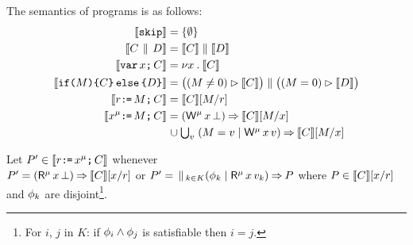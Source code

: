 The semantics of programs is as follows: %
\allowdisplaybreaks
\begin{align*}
  \sem{\SKIP} & =
  \{ \emptyset \}
  \\
  \sem{\aCmd \PAR \bCmd} & =
  \sem{\aCmd} \parallel \sem{\bCmd} 
  \\
  \sem{\VAR\aLoc\SEMI \aCmd} & =
  \nu \aLoc \st \sem{\aCmd}
  \\  
  \sem{\IF{\aExp} \THEN \aCmd \ELSE \bCmd \FI} & =
  \bigl((\aExp \neq 0) \guard \sem{\aCmd}\bigr) \parallel \bigl((\aExp=0) \guard \sem{\bCmd}\bigr) 
  \\
  \sem{\aReg\GETS\aExp\SEMI \aCmd} & =
  \sem{\aCmd}[\aExp/\aReg] 
  \\
  \sem{\aLoc^\amode\GETS\aExp\SEMI \aCmd} & =
  (\iDWmode{\aLoc}{}) \prefix \sem{\aCmd}[\aExp/\aLoc]
  \\ & \mkern2mu\cup
  \textstyle\bigcup_\aVal\; (\aExp=\aVal \mid \DWmode\aLoc\aVal) \prefix \sem{\aCmd}[\aExp/\aLoc]
\end{align*}

\begin{definition}
  Let $P'\in\llbracket r\texttt{:}\mkern-1mu\texttt{=}\,x^\mu\texttt{;}\,\allowbreak C\rrbracket$ whenever\\
  $\aPS'=(\iDRmode{\aLoc}{}) \prefix \sem{\aCmd}[\aLoc/\aReg]$ or
  $\aPS'=\PAR_{k\in K}(\aForm_k \mid \DRmode\aLoc{\aVal_k}) \prefix \aPS$
  where $P\in\llbracket C\rrbracket[x/r]$ and $\phi_k$ are
  disjoint\footnote{For $i$, $j$ in $K$: if $\phi_i \land \phi_j$ is
    satisfiable then $i=j$.}.
\end{definition}

